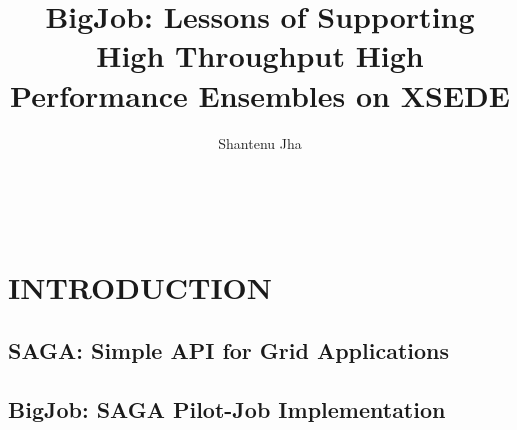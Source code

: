 \documentclass{sig-alternate}
\begin{document}
 {}
\crdata{}


\title{BigJob: Lessons of Supporting High Throughput High Performance Ensembles on XSEDE}

\author{
\alignauthor Shantenu Jha\\
      \\
     \\
      \\
}

\maketitle


\begin{abstract}
\end{abstract}



\section{INTRODUCTION}
\subsection{SAGA: Simple API for Grid Applications}
\subsection{BigJob: SAGA Pilot-Job Implementation}
\end{document}
